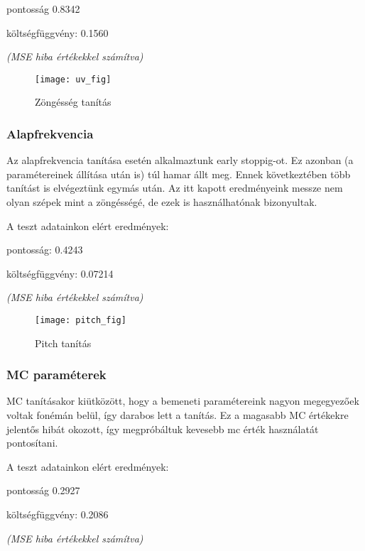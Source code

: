 	pontosság 0.8342
	
	költségfüggvény: 0.1560
	
	\textit{(MSE hiba értékekkel számítva)}

\begin{figure}[h]
	\par\centering
	\texttt{[image: uv\_fig]}
	\caption{Zöngésség tanítás}
\end{figure}

\subsubsection{Alapfrekvencia}
Az alapfrekvencia tanítása esetén alkalmaztunk early stoppig-ot. Ez azonban (a paramétereinek állítása után is) túl hamar állt meg. Ennek következtében több tanítást is elvégeztünk egymás után. Az itt kapott eredményeink messze nem olyan szépek mint a zöngésségé, de ezek is használhatónak bizonyultak.

A teszt adatainkon elért eredmények:

pontosság: 0.4243

költségfüggvény: 0.07214

\textit{(MSE hiba értékekkel számítva)}
\begin{figure}[h]
	\par\centering
	\texttt{[image: pitch\_fig]}
	\caption{Pitch tanítás}
\end{figure}
\subsubsection{MC paraméterek}
MC tanításakor kiütközött, hogy a bemeneti paramétereink nagyon megegyezőek voltak fonémán belül, így darabos lett a tanítás. Ez a magasabb MC értékekre jelentős hibát okozott, így megpróbáltuk kevesebb mc érték használatát pontosítani.

	
	A teszt adatainkon elért eredmények:
	
	pontosság 0.2927
	
	költségfüggvény: 0.2086
	
	\textit{(MSE hiba értékekkel számítva)}
\begin{comment}
Innen hiányzik egy kép
\begin{figure}[h]
	\par\centering
	\texttt{[image: length\_fig]}
	\caption{MC paraméterek tanítása}
\end{figure}
\end{comment}
